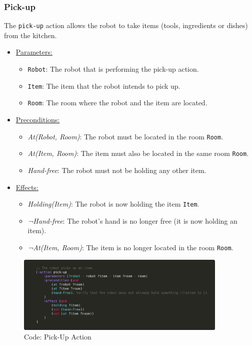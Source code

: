 \documentclass{article}
\begin{document}
\subsubsection{Pick-up}
The \texttt{pick-up} action allows the robot to take items (tools, ingredients or dishes) from the kitchen.

\begin{itemize}
    \item \underline{Parameters:}
    \begin{itemize}
        \item \texttt{Robot}: The robot that is performing the pick-up action.
        \item \texttt{Item}: The item that the robot intends to pick up.
        \item \texttt{Room}: The room where the robot and the item are located.
    \end{itemize}
    \item \underline{Preconditions:}
    \begin{itemize}
        \item \textit{At(Robot, Room)}: The robot must be located in the room \texttt{Room}.
        \item \textit{At(Item, Room)}: The item must also be located in the same room \texttt{Room}.
        \item \textit{Hand-free}: The robot must not be holding any other item.
    \end{itemize}
    \item \underline{Effects:}
    \begin{itemize}
        \item \textit{Holding(Item)}: The robot is now holding the item \texttt{Item}.
        \item \textit{¬Hand-free}: The robot's hand is no longer free (it is now holding an item).
        \item \textit{¬At(Item, Room)}: The item is no longer located in the room \texttt{Room}.
    \end{itemize}
\end{itemize}
\begin{figure}[ht]
    \centering
    \includegraphics[width=0.90\textwidth]{assets/pick-up.png}
    \caption{Code: Pick-Up Action}
    \label{fig:act:pick-up}
\end{figure}
\end{document}
